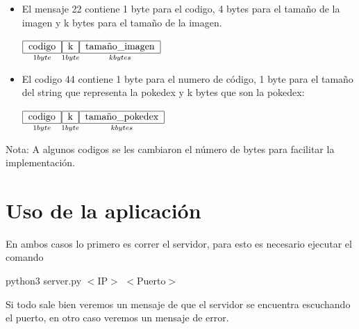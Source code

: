 \documentclass[11pt,letterpaper]{article}
\begin{document}
\begin{itemize}
	\item El mensaje 22 contiene 1 byte para el codigo, 4 bytes para el tamaño de la imagen y k bytes para el tamaño de la imagen.
	
	$\underset{1 byte}{\begin{tabular}{|c|}
		\hline 
		codigo \\ 
		\hline 
		\end{tabular}}\underset{1 byte}{\begin{tabular}{|c|}
		\hline 
		k \\ 
		\hline 
		\end{tabular}}\underset{k bytes}{\begin{tabular}{|c|}
		\hline 
		tamaño\_imagen \\ 
		\hline 
		\end{tabular}} $
	
	\item El codigo 44 contiene 1 byte para el numero de código, 1 byte para el tamaño del string que representa la pokedex y k bytes que son la pokedex: 
	
	
	$\underset{1 byte}{\begin{tabular}{|c|}
		\hline 
		codigo \\ 
		\hline 
		\end{tabular}}\underset{1 byte}{\begin{tabular}{|c|}
		\hline 
		k \\ 
		\hline 
		\end{tabular}}\underset{k bytes}{\begin{tabular}{|c|}
		\hline 
		tamaño\_pokedex \\ 
		\hline 
		\end{tabular}} $
\end{itemize}


{\tiny Nota: A algunos codigos se les cambiaron el número de bytes para facilitar la implementación.}

\section{Uso de la aplicación}

En ambos casos lo primero es correr el servidor, para esto es necesario ejecutar el comando

\textsf{python3 server.py $<$IP$>$ $<$Puerto$>$}

Si todo sale bien veremos un mensaje de que el servidor se encuentra escuchando el puerto, en otro caso veremos un mensaje de error.
\end{document}
